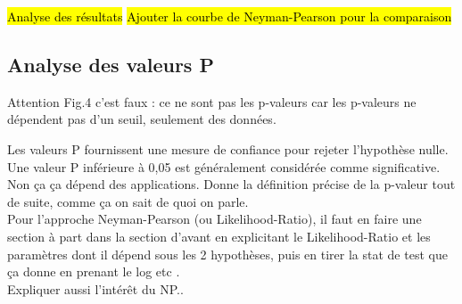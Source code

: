 \documentclass{article}
\newcommand{\dm}[1]{{\color{mulberry} #1}}
\begin{document}
\hl{Analyse des résultats}
\hl{Ajouter la courbe de Neyman-Pearson pour la comparaison}

\subsection{Analyse des valeurs P}

\dm{Attention Fig.4 c'est faux : ce ne sont pas les p-valeurs car les p-valeurs ne dépendent pas d'un seuil, seulement des données.}

Les valeurs P fournissent une mesure de confiance pour rejeter l'hypothèse nulle. Une valeur P inférieure à 0,05 est généralement considérée comme significative. \dm{Non ça ça dépend des applications. Donne la définition précise de la p-valeur tout de suite, comme ça on sait de quoi on parle. }\\

\dm{Pour l'approche Neyman-Pearson (ou Likelihood-Ratio), il faut en faire une section à part dans la section d'avant en explicitant le Likelihood-Ratio et les paramètres dont il dépend sous les 2 hypothèses, puis en tirer la stat de test que ça donne en prenant le log etc .\\
Expliquer aussi l'intérêt du NP.}.
\end{document}
